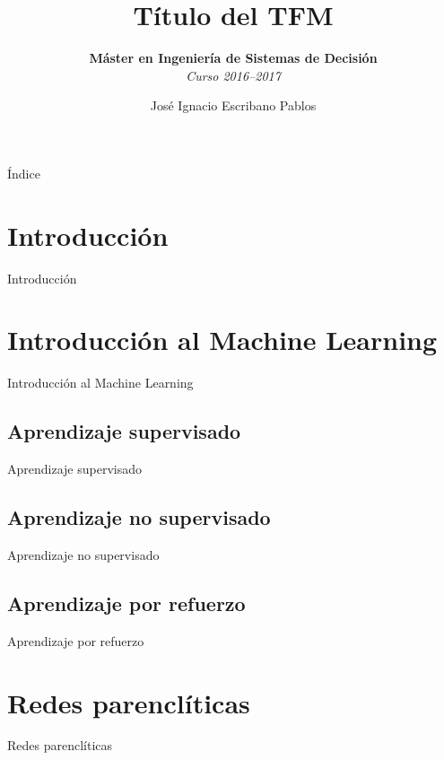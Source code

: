 \documentclass[hyperref={unicode}]{beamer}
\title{Título del TFM}
\subtitle{\textbf{Máster en Ingeniería de Sistemas de Decisión} \\ \textit{Curso 2016--2017}}
\author{José Ignacio Escribano Pablos}
\institute{Ana Elizabeth García Sipols \\ Miguel Romance del Río}
\begin{document}
\setcounter{showProgressBar}{0}
\setcounter{showSlideNumbers}{0}

\frame{\titlepage}

\begin{frame}{Índice}
	\tableofcontents
\end{frame}

\setcounter{framenumber}{0}
\setcounter{showProgressBar}{1}
\setcounter{showSlideNumbers}{1}
\section{Introducción}
\begin{frame}{Introducción}
	
\end{frame}

\section{Introducción al Machine Learning}
\begin{frame}{Introducción al Machine Learning}

\end{frame}

\subsection{Aprendizaje supervisado}
\begin{frame}{Aprendizaje supervisado}
	
\end{frame}

\subsection{Aprendizaje no supervisado}
\begin{frame}{Aprendizaje no supervisado}
	
\end{frame}

\subsection{Aprendizaje por refuerzo}
\begin{frame}{Aprendizaje por refuerzo}
	
\end{frame}

\section{Redes parenclíticas}
\begin{frame}{Redes parenclíticas}
	
\end{frame}
\end{document}
